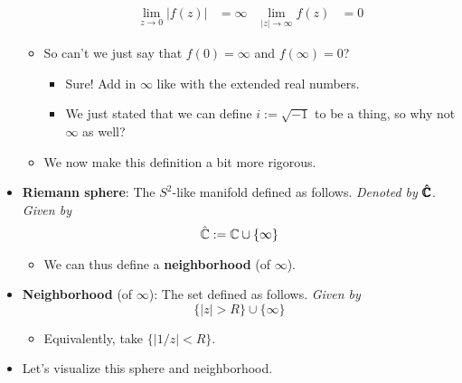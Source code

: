 \documentclass[../notes.tex]{subfiles}
\begin{document}
\begin{itemize}
\begin{itemize}
        \begin{align*}
            \lim_{z\to 0}|f(z)| &= \infty&
            \lim_{|z|\to\infty}f(z) &= 0
        \end{align*}
        \item So can't we just say that $f(0)=\infty$ and $f(\infty)=0$?
        \begin{itemize}
            \item Sure! Add in $\infty$ like with the extended real numbers.
            \item We just stated that we can define $i:=\sqrt{-1}$ to be a thing, so why not $\infty$ as well?
        \end{itemize}
        \item We now make this definition a bit more rigorous.
    \end{itemize}
    \item \textbf{Riemann sphere}: The $S^2$-like manifold defined as follows. \emph{Denoted by} $\bm{\hat{\pmb{\mathbb{C}}}}$. \emph{Given by}
    \begin{equation*}
        \hat{\mathbb{C}} := \mathbb{C}\cup\{\infty\}
    \end{equation*}
    \begin{itemize}
        \item We can thus define a \textbf{neighborhood} (of $\infty$).
    \end{itemize}
    \item \textbf{Neighborhood} (of $\infty$): The set defined as follows. \emph{Given by}
    \begin{equation*}
        \{|z|>R\}\cup\{\infty\}
    \end{equation*}
    \begin{itemize}
        \item Equivalently, take $\{|1/z|<R\}$.
    \end{itemize}
    \item Let's visualize this sphere and neighborhood.
    \begin{figure}[h!]
        \centering
\end{figure}
\end{itemize}
\end{document}
